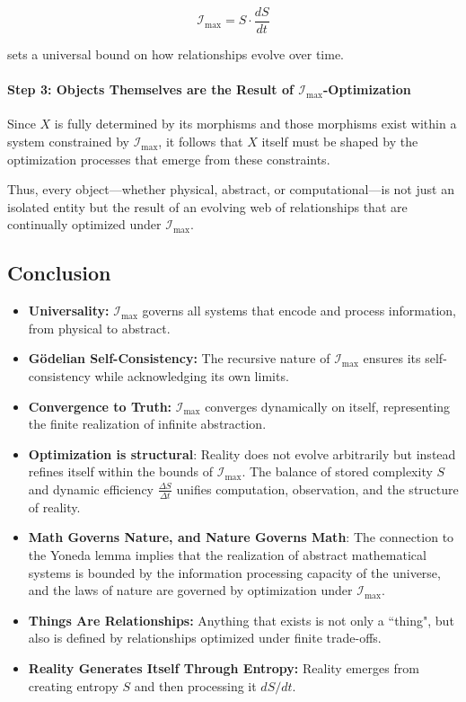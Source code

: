 \documentclass[12pt]{article}
\begin{document}
\begin{equation}
    \mathcal{I}_{\max} = S \cdot \frac{dS}{dt}
\end{equation}

sets a universal bound on how relationships evolve over time. 

\paragraph{Step 3: Objects Themselves are the Result of \(\mathcal{I}_{\max}\)-Optimization}
Since \( X \) is fully determined by its morphisms and those morphisms exist within a system constrained by \(\mathcal{I}_{\max}\), it follows that \( X \) itself must be shaped by the optimization processes that emerge from these constraints. 

Thus, every object—whether physical, abstract, or computational—is not just an isolated entity but the result of an evolving web of relationships that are continually optimized under \(\mathcal{I}_{\max}\).


\subsection{Conclusion}

\begin{itemize}
    \item \textbf{Universality:} \(\mathcal{I}_{\text{max}}\) governs all systems that encode and process information, from physical to abstract.
    \item \textbf{Gödelian Self-Consistency:} The recursive nature of \(\mathcal{I}_{\text{max}}\) ensures its self-consistency while acknowledging its own limits.
    \item \textbf{Convergence to Truth:} \(\mathcal{I}_{\text{max}}\) converges dynamically on itself, representing the finite realization of infinite abstraction.
    \item \textbf{Optimization is structural}: Reality does not evolve arbitrarily but instead refines itself within the bounds of \(\mathcal{I}_{\max}\). The balance of stored complexity \(S\) and dynamic efficiency \(\frac{\Delta S}{\Delta t}\) unifies computation, observation, and the structure of reality.
    \item \textbf{Math Governs Nature, and Nature Governs Math}: The connection to the Yoneda lemma implies that the realization of abstract mathematical systems is bounded by the information processing capacity of the universe, and the laws of nature are governed by optimization under \(\mathcal{I}_{\text{max}}\).
    \item \textbf{Things Are Relationships:} Anything that exists is not only a ``thing", but also is defined by relationships optimized under finite trade-offs.
    \item \textbf{Reality Generates Itself Through Entropy:} Reality emerges from creating entropy $S$ and then processing it $dS/dt$.
\end{itemize}
\end{document}
